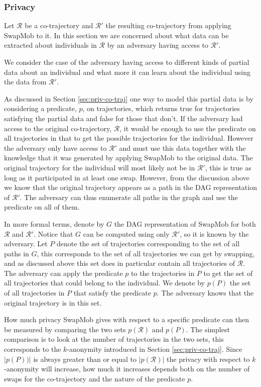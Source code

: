 \documentclass[12pt]{article}
\newcommand{\cotraj}{\mathcal{R}}
\newcommand{\pred}{p}
\newcommand{\DAG}{G}
\newcommand{\paths}{P}
\theoremstyle{definition}
\begin{document}
\subsubsection{Privacy}
Let \(\cotraj\) be a co-trajectory and \(\cotraj'\) the resulting
co-trajectory from applying SwapMob to it. In this section we are
concerned about what data can be extracted about individuals in
\(\cotraj\) by an adversary having access to \(\cotraj'\).

We consider the case of the adversary having access to different kinds
of partial data about an individual and what more it can learn about
the individual using the data from \(\cotraj'\).

As discussed in Section \ref{sec:priv-co-traj} one way to model this
partial data is by considering a predicate, \(\pred\), on
trajectories, which returns true for trajectories satisfying the
partial data and false for those that don't. If the adversary had
access to the original co-trajectory, \(\cotraj\), it would be enough
to use the predicate on all trajectories in that to get the possible
trajectories for the individual. However the adversary only have
access to \(\cotraj'\) and must use this data together with the
knowledge that it was generated by applying SwapMob to the original
data. The original trajectory for the individual will most likely not
be in \(\cotraj'\), this is true as long as it participated in at
least one swap. However, from the discussion above we know that the
original trajectory appears as a path in the DAG representation of
\(\cotraj'\). The adversary can thus enumerate all paths in the graph
and use the predicate on all of them.

In more formal terms, denote by \(\DAG\) the DAG representation of
SwapMob for both \(\cotraj\) and \(\cotraj'\). Notice that \(\DAG\)
can be computed using only \(\cotraj'\), so it is known by the
adversary. Let \(\paths\) denote the set of trajectories corresponding
to the set of all paths in \(\DAG\), this corresponds to the set of
all trajectories we can get by swapping, and as discussed above this
set does in particular contain all trajectories of \(\cotraj\). The
adversary can apply the predicate \(\pred\) to the trajectories in
\(\paths\) to get the set of all trajectories that could belong to the
individual. We denote by \(\pred(\paths)\) the set of all trajectories
in \(\paths\) that satisfy the predicate \(\pred\). The adversary
knows that the original trajectory is in this set.

How much privacy SwapMob gives with respect to a specific predicate
can then be measured by comparing the two sets \(\pred(\cotraj)\) and
\(\pred(\paths)\). The simplest comparison is to look at the number of
trajectories in the two sets, this corresponds to the \(k\)-anonymity
introduced in Section \ref{sec:priv-co-traj}. Since
\(|\pred(\paths))|\) is always greater than or equal to
\(|\pred(\cotraj)|\) the privacy with respect to \(k\)-anonymity will
increase, how much it increases depends both on the number of swaps
for the co-trajectory and the nature of the predicate \(\pred\).
\end{document}
